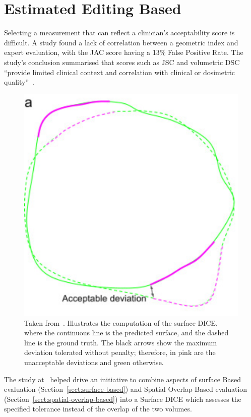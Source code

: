 \documentclass[11pt,twoside]{report}
\begin{document}
\section{Estimated Editing Based}\label{sect:surface-dice}

Selecting a measurement that can reflect a clinician's acceptability score is difficult. A study found a lack of correlation between a geometric index and expert evaluation, with the JAC score having a 13\% False Positive Rate. The study's conclusion summarised that scores such as JSC and volumetric DSC ``provide limited clinical context and correlation with clinical or dosimetric quality''~\cite{Sherer2021-le}.


\begin{figure}
  \centering
  \includegraphics[width=0.3\linewidth]{../figures/Surface-dice.png}
  \caption{Taken from~\cite{Nikolov2021-xe}. Illustrates the computation of the surface DICE, where the continuous line is the predicted surface, and the dashed line is the ground truth. The black arrows show the maximum deviation tolerated without penalty; therefore, in pink are the unacceptable deviations and green otherwise.}\label{fig:surface-dice}
\end{figure}

The study at~\cite{Sherer2021-le} helped drive an initiative to combine aspects of surface Based evaluation (Section~\ref{sect:surface-based}) and Spatial Overlap Based evaluation (Section~\ref{sect:spatial-overlap-based}) into a Surface DICE which assesses the specified tolerance instead of the overlap of the two volumes.
\end{document}
